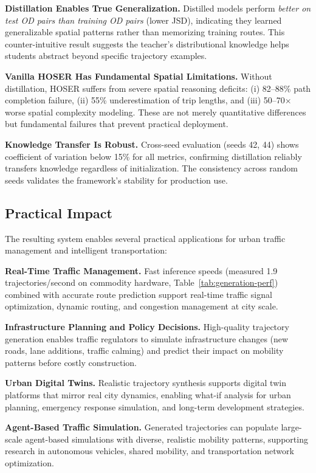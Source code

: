 \textbf{Distillation Enables True Generalization.} Distilled models perform \emph{better on test OD pairs than training OD pairs} (lower JSD), indicating they learned generalizable spatial patterns rather than memorizing training routes. This counter-intuitive result suggests the teacher's distributional knowledge helps students abstract beyond specific trajectory examples.

\textbf{Vanilla HOSER Has Fundamental Spatial Limitations.} Without distillation, HOSER suffers from severe spatial reasoning deficits: (i) 82--88\% path completion failure, (ii) 55\% underestimation of trip lengths, and (iii) 50--70$\times$ worse spatial complexity modeling. These are not merely quantitative differences but fundamental failures that prevent practical deployment.

\textbf{Knowledge Transfer Is Robust.} Cross-seed evaluation (seeds 42, 44) shows coefficient of variation below 15\% for all metrics, confirming distillation reliably transfers knowledge regardless of initialization. The consistency across random seeds validates the framework's stability for production use.

\subsection{Practical Impact}
\label{sec:conclusion-impact}

The resulting system enables several practical applications for urban traffic management and intelligent transportation:

\textbf{Real-Time Traffic Management.} Fast inference speeds (measured 1.9 trajectories/second on commodity hardware, Table~\ref{tab:generation-perf}) combined with accurate route prediction support real-time traffic signal optimization, dynamic routing, and congestion management at city scale.

\textbf{Infrastructure Planning and Policy Decisions.} High-quality trajectory generation enables traffic regulators to simulate infrastructure changes (new roads, lane additions, traffic calming) and predict their impact on mobility patterns before costly construction.

\textbf{Urban Digital Twins.} Realistic trajectory synthesis supports digital twin platforms that mirror real city dynamics, enabling what-if analysis for urban planning, emergency response simulation, and long-term development strategies.

\textbf{Agent-Based Traffic Simulation.} Generated trajectories can populate large-scale agent-based simulations with diverse, realistic mobility patterns, supporting research in autonomous vehicles, shared mobility, and transportation network optimization.

